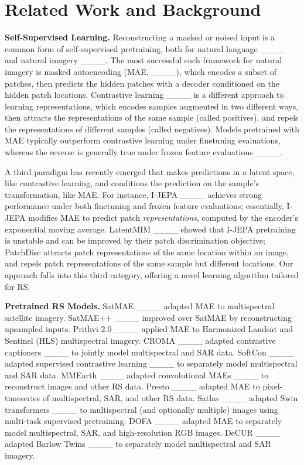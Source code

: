 \section{Related Work and Background}
\textbf{Self-Supervised Learning.} Reconstructing a masked or noised input is a common form of self-supervised pretraining, both for natural language ____ and natural imagery ____. The most successful such framework for natural imagery is masked autoencoding (MAE, ____), which encodes a subset of patches, then predicts the hidden patches with a decoder conditioned on the hidden patch locations. 
%
Contrastive learning ____ is a different approach to learning representations, which encodes samples augmented in two different ways, then attracts the representations of the same sample (called positives), and repels the representations of different samples (called negatives). 
%
Models pretrained with MAE typically outperform contrastive learning under finetuning evaluations, whereas the reverse is generally true under frozen feature evaluations ____. 

A third paradigm has recently emerged that makes predictions in a latent space, like contrastive learning, and conditions the prediction on the sample's transformation, like MAE. For instance, I-JEPA ____ achieves strong performance under both finetuning and frozen feature evaluations; essentially, I-JEPA modifies MAE to predict patch \emph{representations}, computed by the encoder's exponential moving average. LatentMIM ____ showed that I-JEPA pretraining is unstable and can be improved by their patch discrimination objective; PatchDisc attracts patch representations of the same location within an image, and repels patch representations of the same sample but different locations. Our approach falls into this third category, offering a novel learning algorithm tailored for RS.

\textbf{Pretrained RS Models.} \label{sec:pretrained_rs} SatMAE ____ adapted MAE to multispectral satellite imagery. SatMAE++ ____ improved over SatMAE by reconstructing upsampled inputs. Prithvi 2.0 ____ applied MAE to Harmonized Landsat and Sentinel (HLS) multispectral imagery. CROMA ____ adapted contrastive captioners ____ to jointly model multispectral and SAR data. SoftCon ____ adapted supervised contrastive learning ____ to separately model multispectral and SAR data. MMEarth ____ adapted convolutional MAEs ____ to reconstruct images and other RS data. Presto ____ adapted MAE to pixel-timeseries of multispectral, SAR, and other RS data. Satlas ____ adapted Swin transformers ____ to multispectral (and optionally multiple) images using multi-task supervised pretraining. DOFA ____ adapted MAE to separately model multispectral, SAR, and high-resolution RGB images. DeCUR ____ adapted Barlow Twins ____ to separately model multispectral and SAR imagery. 

